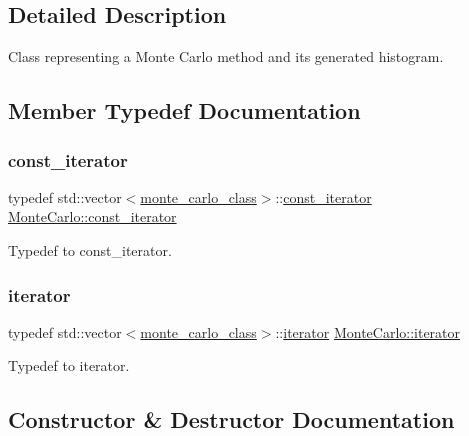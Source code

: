\subsection{Detailed Description}
Class representing a Monte Carlo method and its generated histogram. 

\subsection{Member Typedef Documentation}
\mbox{\label{classMonteCarlo_a74dc0884e3b02002956de4fb84a0bb01}} 
\subsubsection{\texorpdfstring{const\+\_\+iterator}{const\_iterator}}
{\footnotesize\ttfamily typedef std\+::vector$<$\hyperlink{structMonteCarlo_1_1monte__carlo__class}{monte\+\_\+carlo\+\_\+class}$>$\+::\hyperlink{classMonteCarlo_a74dc0884e3b02002956de4fb84a0bb01}{const\+\_\+iterator} \hyperlink{classMonteCarlo_a74dc0884e3b02002956de4fb84a0bb01}{Monte\+Carlo\+::const\+\_\+iterator}}

Typedef to const\+\_\+iterator. \mbox{\label{classMonteCarlo_a8f83ff48a51d2f19e5c87b8fade7bbe3}} 
\subsubsection{\texorpdfstring{iterator}{iterator}}
{\footnotesize\ttfamily typedef std\+::vector$<$\hyperlink{structMonteCarlo_1_1monte__carlo__class}{monte\+\_\+carlo\+\_\+class}$>$\+::\hyperlink{classMonteCarlo_a8f83ff48a51d2f19e5c87b8fade7bbe3}{iterator} \hyperlink{classMonteCarlo_a8f83ff48a51d2f19e5c87b8fade7bbe3}{Monte\+Carlo\+::iterator}}

Typedef to iterator. 

\subsection{Constructor \& Destructor Documentation}
\mbox{\label{classMonteCarlo_a1620378a238453e1203ffb45d8b9df82}} 
